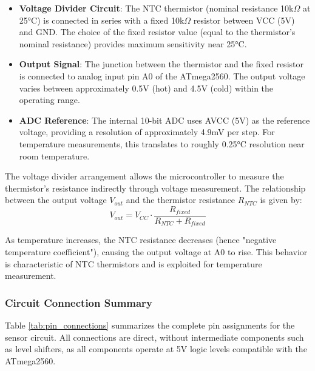 \begin{itemize}
    \item \textbf{Voltage Divider Circuit}: The NTC thermistor (nominal resistance 10k$\Omega$ at 25°C) is connected in series with a fixed 10k$\Omega$ resistor between VCC (5V) and GND. The choice of the fixed resistor value (equal to the thermistor's nominal resistance) provides maximum sensitivity near 25°C.
    \item \textbf{Output Signal}: The junction between the thermistor and the fixed resistor is connected to analog input pin A0 of the ATmega2560. The output voltage varies between approximately 0.5V (hot) and 4.5V (cold) within the operating range.
    \item \textbf{ADC Reference}: The internal 10-bit ADC uses AVCC (5V) as the reference voltage, providing a resolution of approximately 4.9mV per step. For temperature measurements, this translates to roughly 0.25°C resolution near room temperature.
\end{itemize}

The voltage divider arrangement allows the microcontroller to measure the thermistor's resistance indirectly through voltage measurement. The relationship between the output voltage $V_{out}$ and the thermistor resistance $R_{NTC}$ is given by:
\begin{equation}
V_{out} = V_{CC} \cdot \frac{R_{fixed}}{R_{NTC} + R_{fixed}}
\end{equation}

As temperature increases, the NTC resistance decreases (hence "negative temperature coefficient"), causing the output voltage at A0 to rise. This behavior is characteristic of NTC thermistors and is exploited for temperature measurement.

\subsubsection{Circuit Connection Summary}
Table \ref{tab:pin_connections} summarizes the complete pin assignments for the sensor circuit. All connections are direct, without intermediate components such as level shifters, as all components operate at 5V logic levels compatible with the ATmega2560.

